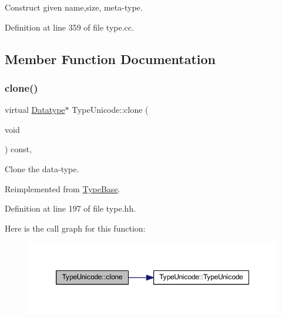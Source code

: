 Construct given name,size, meta-\/type. 



Definition at line 359 of file type.\+cc.



\subsection{Member Function Documentation}
\mbox{\label{class_type_unicode_ab347e36debf5530b33cbfa2b329f9554}} 
\subsubsection{\texorpdfstring{clone()}{clone()}}
{\footnotesize\ttfamily virtual \mbox{\hyperlink{class_datatype}{Datatype}}$\ast$ Type\+Unicode\+::clone (\begin{DoxyParamCaption}\item[{void}]{ }\end{DoxyParamCaption}) const\hspace{0.3cm}{\ttfamily [inline]}, {\ttfamily [virtual]}}



Clone the data-\/type. 



Reimplemented from \mbox{\hyperlink{class_type_base_ad506116cf9bf5bc6d13654b38609d184}{Type\+Base}}.



Definition at line 197 of file type.\+hh.

Here is the call graph for this function\+:
\nopagebreak
\begin{figure}[H]
\begin{center}
\leavevmode
\includegraphics[width=350pt]{class_type_unicode_ab347e36debf5530b33cbfa2b329f9554_cgraph}
\end{center}
\end{figure}
\mbox{\label{class_type_unicode_a3158417117649e59ffe402137c22bb67}} 
